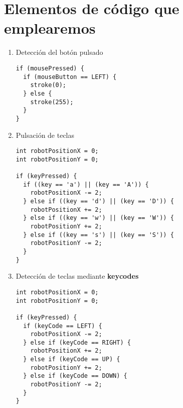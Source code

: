 \documentclass[a4paper,oneside]{article}
\begin{document}
\section{Elementos de código que emplearemos}
\begin{enumerate}
  \item Detección del botón pulsado

    \begin{verbatim}
if (mousePressed) {
  if (mouseButton == LEFT) {
    stroke(0);
  } else {
    stroke(255);
  }
}
    \end{verbatim}

  \item Pulsación de teclas

    \begin{verbatim}
int robotPositionX = 0;
int robotPositionY = 0;

if (keyPressed) {
  if ((key == 'a') || (key == 'A')) {
    robotPositionX -= 2;
  } else if ((key == 'd') || (key == 'D')) {
    robotPositionX += 2;
  } else if ((key == 'w') || (key == 'W')) {
    robotPositionY += 2;
  } else if ((key == 's') || (key == 'S')) {
    robotPositionY -= 2;
  }
}
    \end{verbatim}
      
  \item Detección de teclas mediante \textbf{keycodes}

    \begin{verbatim}
int robotPositionX = 0;
int robotPositionY = 0;

if (keyPressed) {
  if (keyCode == LEFT) {
    robotPositionX -= 2;
  } else if (keyCode == RIGHT) {
    robotPositionX += 2;
  } else if (keyCode == UP) {
    robotPositionY += 2;
  } else if (keyCode == DOWN) {
    robotPositionY -= 2;
  }
}
    \end{verbatim}

\end{enumerate}
\end{document}
